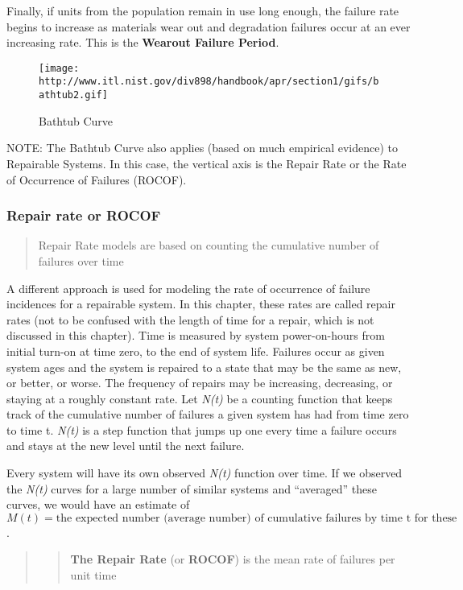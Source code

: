 \documentclass[]{book}
\theoremstyle{definition}
\theoremstyle{definition}
\theoremstyle{definition}
\theoremstyle{remark}
\begin{document}
Finally, if units from the population remain in use long enough, the
failure rate begins to increase as materials wear out and degradation
failures occur at an ever increasing rate. This is the \textbf{Wearout
Failure Period}.

\begin{figure}
\centering
\texttt{[image: http://www.itl.nist.gov/div898/handbook/apr/section1/gifs/bathtub2.gif]}
\caption{Bathtub Curve}
\end{figure}

NOTE: The Bathtub Curve also applies (based on much empirical evidence)
to Repairable Systems. In this case, the vertical axis is the Repair
Rate or the Rate of Occurrence of Failures (ROCOF).

\subsubsection{Repair rate or ROCOF}\label{repair-rate-or-rocof}

\begin{quote}
Repair Rate models are based on counting the cumulative number of
failures over time
\end{quote}

A different approach is used for modeling the rate of occurrence of
failure incidences for a repairable system. In this chapter, these rates
are called repair rates (not to be confused with the length of time for
a repair, which is not discussed in this chapter). Time is measured by
system power-on-hours from initial turn-on at time zero, to the end of
system life. Failures occur as given system ages and the system is
repaired to a state that may be the same as new, or better, or worse.
The frequency of repairs may be increasing, decreasing, or staying at a
roughly constant rate. Let \emph{N(t)} be a counting function that keeps
track of the cumulative number of failures a given system has had from
time zero to time t. \emph{N(t)} is a step function that jumps up one
every time a failure occurs and stays at the new level until the next
failure.

Every system will have its own observed \emph{N(t)} function over time.
If we observed the \emph{N(t)} curves for a large number of similar
systems and ``averaged'' these curves, we would have an estimate of
\(M(t) = \mbox{the expected number (average number) of cumulative failures by time t for these systems}\).

\begin{quote}
\begin{quote}
\textbf{The Repair Rate} (or \textbf{ROCOF}) is the mean rate of
failures per unit time
\end{quote}
\end{quote}
\end{document}
